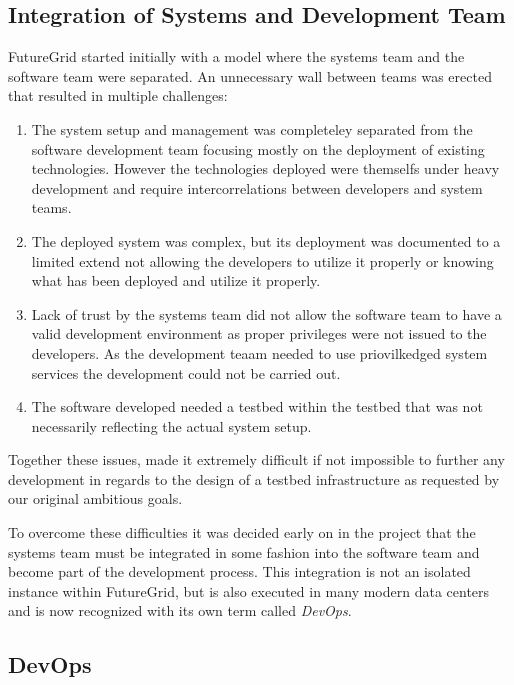 \documentclass{article}
\begin{document}
\subsection{Integration of Systems and Development Team}

FutureGrid started initially with a model where the systems team and the software team were separated. An unnecessary wall between teams was erected that resulted in multiple challenges:

\begin{enumerate}

\item The system setup and management was  completeley separated from the software development team focusing mostly on the deployment of existing technologies. However the technologies deployed were themselfs under heavy development and require intercorrelations between developers and system teams.

\item The deployed system was complex, but its deployment was documented to a limited extend not allowing the developers to utilize it properly or knowing what has been deployed and utilize it properly.

\item Lack of trust by the systems team did not allow the software team to have a valid development environment as proper privileges were not issued to the developers. As the development teaam needed to use priovilkedged system services the development could not be carried out.

\item The software developed needed a testbed within the testbed that was not necessarily reflecting the actual system setup.

\end{enumerate}

Together these issues, made it extremely difficult if not impossible to further any development in regards to the design of a testbed infrastructure as requested by our original ambitious goals.

To overcome these difficulties it was decided early on in the project that the systems team must be integrated in some fashion into the software team and become part of the development process. This integration is not an isolated instance within FutureGrid, but is also executed in many modern data centers and is now recognized with its own term called {\em DevOps}.

\subsection{DevOps}
\end{document}
